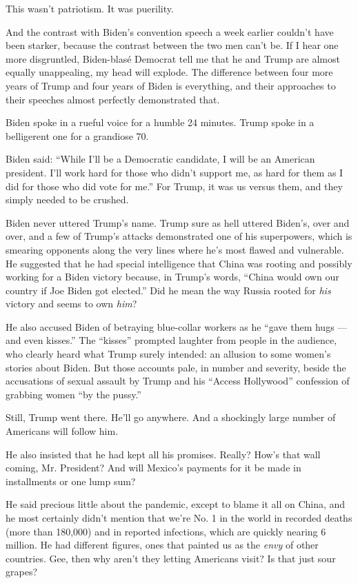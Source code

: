 This wasn't patriotism. It was puerility.

And the contrast with Biden's convention speech a week earlier couldn't
have been starker, because the contrast between the two men can't be. If
I hear one more disgruntled, Biden-blasé Democrat tell me that he and
Trump are almost equally unappealing, my head will explode. The
difference between four more years of Trump and four years of Biden is
everything, and their approaches to their speeches almost perfectly
demonstrated that.

Biden spoke in a rueful voice for a humble 24 minutes. Trump spoke in a
belligerent one for a grandiose 70.

Biden said: ``While I'll be a Democratic candidate, I will be an
American president. I'll work hard for those who didn't support me, as
hard for them as I did for those who did vote for me.'' For Trump, it
was us versus them, and they simply needed to be crushed.

Biden never uttered Trump's name. Trump sure as hell uttered Biden's,
over and over, and a few of Trump's attacks demonstrated one of his
superpowers, which is smearing opponents along the very lines where he's
most flawed and vulnerable. He suggested that he had special
intelligence that China was rooting and possibly working for a Biden
victory because, in Trump's words, ``China would own our country if Joe
Biden got elected.'' Did he mean the way Russia rooted for \emph{his}
victory and seems to own \emph{him}?

He also accused Biden of betraying blue-collar workers as he ``gave them
hugs --- and even kisses.'' The ``kisses'' prompted laughter from people
in the audience, who clearly heard what Trump surely intended: an
allusion to some women's stories about Biden. But those accounts pale,
in number and severity, beside the accusations of sexual assault by
Trump and his ``Access Hollywood'' confession of grabbing women ``by the
pussy.''

Still, Trump went there. He'll go anywhere. And a shockingly large
number of Americans will follow him.

He also insisted that he had kept all his promises. Really? How's that
wall coming, Mr. President? And will Mexico's payments for it be made in
installments or one lump sum?

He said precious little about the pandemic, except to blame it all on
China, and he most certainly didn't mention that we're No. 1 in the
world in recorded deaths (more than 180,000) and in reported infections,
which are quickly nearing 6 million. He had different figures, ones that
painted us as the \emph{envy} of other countries. Gee, then why aren't
they letting Americans visit? Is that just sour grapes?

